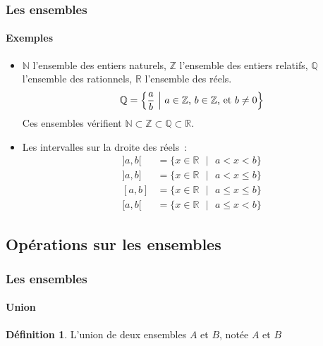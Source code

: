 \documentclass[10pt,notheorems]{beamer}
\theoremstyle{plain}
\theoremstyle{definition} %
\newtheorem{definition}{Définition}
\begin{document}
\begin{frame}
  \frametitle{Les ensembles}
  \framesubtitle{Exemples}
  \hypertarget{slide_ensembles_exemples}{}

  \begin{itemize}

  \item $\mathbb N$ l'ensemble des entiers naturels, $\mathbb Z$
    l'ensemble des entiers relatifs, $\mathbb Q$ l'ensemble des
    rationnels, $\mathbb R$ l'ensemble des réels.
    \[
      \mathbb Q = \left\{ \frac{a}{b}\text{ }\Bigl|\text{ }a\in\mathbb Z\text{, }b\in\mathbb Z\text{, et }b\neq 0\right\}
    \]
    Ces ensembles vérifient $\mathbb N \subset \mathbb Z \subset \mathbb Q \subset \mathbb R$.\newline

  \item Les intervalles sur la droite des réels~:
    \[
      \begin{split}
        ]a,b[ &= \{x\in\mathbb R\text{ }|\text{ }a<x<b\}\\
        ]a,b] &= \{x\in\mathbb R\text{ }|\text{ }a<x\leq b\}\\
        [a,b] &= \{x\in\mathbb R\text{ }|\text{ }a\leq x\leq b\}\\
        [a,b[ &= \{x\in\mathbb R\text{ }|\text{ }a\leq x< b\}
      \end{split}
    \]

  \end{itemize}

\end{frame}

\subsection{Opérations sur les ensembles}


\begin{frame}
  \frametitle{Les ensembles}
  \framesubtitle{Union}
  \hypertarget{slide_ensembles_union_1}{}

  \begin{definition} L'union de deux ensembles $A$ et $B$, notée $A$ et $B$

  \end{definition}


\end{frame}
\end{document}
